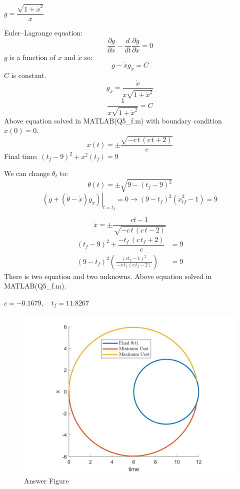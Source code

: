 $g = \dfrac{\sqrt{1+\dot x^2}}{x}$


Euler–Lagrange equation:
$$\dfrac{\partial g}{\partial x} - \dfrac{d}{dt}\dfrac{\partial g}{\partial \dot x} = 0$$
$g$ is a function of $x$ and $\dot x$ so:
$$g - \dot{x}g_{\dot x} = C$$
$C$ is constant.
$$g_{\dot{x}} = \dfrac{\dot x}{x\sqrt{1+\dot x^2}}$$
$$\dfrac{1}{x\sqrt{1+\dot x^2}}=C$$
Above equation solved in MATLAB(Q5\_f.m) with boundary condition $x(0) = 0$.
$$x(t) = \pm \dfrac{\sqrt{-c\,t\,{\left(c\,t+2\right)}}}{c}$$
Final time: 
$(t_f - 9)^2 + x^2(t_f) = 9$


We can change $\theta_{t}$ to:
$$\theta(t) = \pm \sqrt{9 - (t_f-9)^2}$$
$$\left.(g + (\dot{\theta}-\dot{x})g_{\dot{x}})\right\vert_{t = t_f}  = 0 \to (9-t_f)^2(\dot x_{tf}^2-1) = 9$$

$$\dot x =\pm \frac{ct-1}{\,
	\sqrt{-c\,t\,{\left(c\,t-2\right)}}}$$
\begin{align*}
	(t_f - 9)^2 + \dfrac{{-t_f\,{\left(c\,t_f+2\right)}}}{c} &= 9\\	
	(9-t_f)^2(\frac{(ct_f-1)^2}{\,
		{-c\,t_f\,{\left(c\,t_f-2\right)}}}) & = 9
\end{align*}
There is two equation and two unknowns.
Above equation solved in MATLAB(Q5\_f.m).



$c = -0.1679, \quad t_f = 11.8267$

\begin{figure}[H]
	\caption{Answer Figure}
	\centering
	\includegraphics[width=12cm]{Q5/figures/Figure5fFix.png}
\end{figure}
